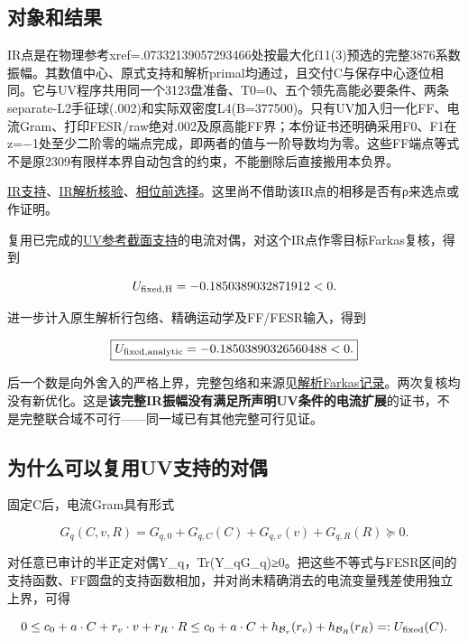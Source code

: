 \documentclass[
  10pt,
  a4paper,
]{article}
\begin{document}
\subsection{对象和结果}\label{ux5bf9ux8c61ux548cux7ed3ux679c}

IR点是在物理参考xref=.07332139057293466处按最大化f11(3)预选的完整3876系数振幅。其数值中心、原式支持和解析primal均通过，且交付C与保存中心逐位相同。它与UV程序共用同一个3123盘准备、T0=0、五个领先高能必要条件、两条separate-L2手征球(.002)和实际双密度L4(B=377500)。只有UV加入归一化FF、电流Gram、打印FESR/raw绝对.002及原高能FF界；本份证书还明确采用F0、F1在z=−1处至少二阶零的端点完成，即两者的值与一阶导数均为零。这些FF端点等式不是原2309有限样本界自动包含的约束，不能删除后直接搬用本负界。

\href{../../../interlaced_IR_ref_02/report.json}{IR支持}、\href{../../../interlaced_IR_ref_analytic/source_audit.json}{IR解析核验}、\href{../../../interlaced_IR_selected/selection.json}{相位前选择}。这里尚不借助该IR点的相移是否有ρ来选点或作证明。

复用已完成的\href{../../../interlaced_UV_ref_support_01/report.json}{UV参考截面支持}的电流对偶，对这个IR点作零目标Farkas复核，得到

\[
U_{\rm fixed,H}=-0.1850389032871912<0.
\]

进一步计入原生解析行包络、精确运动学及FF/FESR输入，得到

\[
\boxed{U_{\rm fixed,analytic}=-0.18503890326560488<0.}
\]

后一个数是向外舍入的严格上界，完整包络和来源见\href{../../../interlaced_fixed_IR_analytic/report.json}{解析Farkas记录}。两次复核均没有新优化。这是\textbf{该完整IR振幅没有满足所声明UV条件的电流扩展}的证书，不是完整联合域不可行------同一域已有其他完整可行见证。

\subsection{为什么可以复用UV支持的对偶}\label{ux4e3aux4ec0ux4e48ux53efux4ee5ux590dux7528uvux652fux6301ux7684ux5bf9ux5076}

固定C后，电流Gram具有形式

\[
G_q(C,v,R)=G_{q,0}+G_{q,C}(C)+G_{q,v}(v)+G_{q,R}(R)\succeq0.
\]

对任意已审计的半正定对偶Y\_q，Tr(Y\_qG\_q)≥0。把这些不等式与FESR区间的支持函数、FF圆盘的支持函数相加，并对尚未精确消去的电流变量残差使用独立上界，可得

\[
0\le c_0+a\cdot C+r_v\cdot v+r_R\cdot R
\le c_0+a\cdot C+h_{\mathcal B_v}(r_v)+h_{\mathcal B_R}(r_R)
=:U_{\rm fixed}(C).
\]
\end{document}
